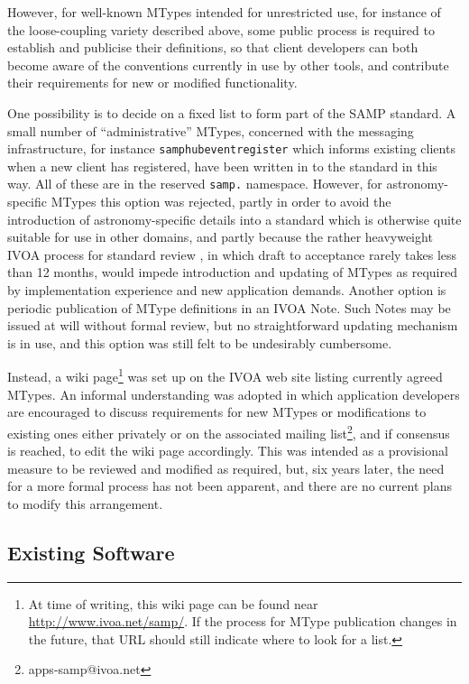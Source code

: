 \documentclass[5p]{elsarticle}
\begin{document}
However, for well-known MTypes intended for unrestricted use,
for instance of the loose-coupling variety described above,
some public process is required to establish
and publicise their definitions, so that client developers can
both become aware of the conventions currently in use by other tools,
and contribute their requirements for new or modified functionality.

One possibility
is to decide on a fixed list to form part of the SAMP standard.
A small number of ``administrative'' MTypes,
concerned with the messaging infrastructure,
for instance {\tt samp{\kdot}hub{\kdot}event{\kdot}register}
which informs existing clients when a new client has registered,
have been written in to the standard in this way.
All of these are in the reserved {\tt samp.} namespace.
However, for astronomy-specific MTypes this option was rejected,
partly in order to avoid the introduction of astronomy-specific details
into a standard which is otherwise quite suitable for use in other domains,
and partly because the rather heavyweight IVOA process for
standard review \citep{ivoadoc},
in which draft to acceptance rarely takes less than 12 months,
would impede introduction and updating of MTypes as required
by implementation experience and new application demands.
Another option is periodic publication of MType definitions
in an IVOA Note.  Such Notes may be issued at will without formal review,
but no straightforward updating mechanism is in use,
and this option was still felt to be undesirably cumbersome.

Instead, a wiki page\footnote{
  At time of writing, this wiki page can be found near
  \url{http://www.ivoa.net/samp/}.
  If the process for MType publication changes in the future,
  that URL should still indicate where to look for a list.}
was set up on the IVOA web site listing currently agreed MTypes.
An informal understanding was adopted in which
application developers are encouraged to discuss requirements for
new MTypes or modifications to existing ones either privately or
on the associated mailing list\footnote{apps-samp@ivoa.net}, 
and if consensus is reached, to edit the wiki page accordingly.
This was intended as a provisional measure to be reviewed and
modified as required, but, six years later, the need for a more
formal process has not been apparent, and there are no current
plans to modify this arrangement.

\subsection{Existing Software} \label{sec:software}
\end{document}
